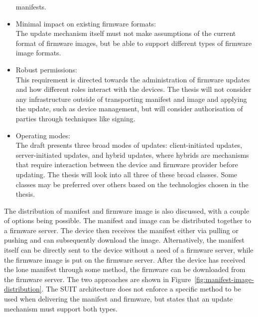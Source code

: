 \documentclass[0-thesis.tex]{subfiles}
\begin{document}
\begin{itemize}
            manifests.
    \item Minimal impact on existing firmware formats:\\
            The update mechanism itself must not make assumptions of the current format of
            firmware images, but be able to support different types of firmware image
            formats.
    \item Robust permissions:\\
            This requirement is directed towards the administration of firmware updates
            and how different roles interact with the devices. The thesis will not
            consider any infrastructure outside of transporting manifest and image and
            applying the update, such as device management, but will consider
            authorisation of parties through techniques like signing.
    \item Operating modes:\\
            The draft presents three broad modes of updates: client-initiated updates,
            server-initiated updates, and hybrid updates, where hybrids are mechanisms
            that require interaction between the device and firmware provider before
            updating. The thesis will look into all three of these broad classes. Some
            classes may be preferred over others based on the technologies chosen in the
            thesis.
\end{itemize}

The distribution of manifest and firmware image is also discussed, with a couple of
options being possible. The manifest and image can be distributed together to a firmware
server. The device then receives the manifest either via pulling or pushing and can
subsequently download the image. Alternatively, the manifest itself can be directly sent
to the device without a need of a firmware server, while the firmware image is put on the
firmware server. After the device has received the lone manifest through some method, the
firmware can be downloaded from the firmware server. The two approaches are shown in
Figure~\ref{fig:manifest-image-distribution}. The SUIT architecture does not enforce a
specific method to be used when delivering the manifest and firmware, but states that an
update mechanism must support both types.
\end{document}
